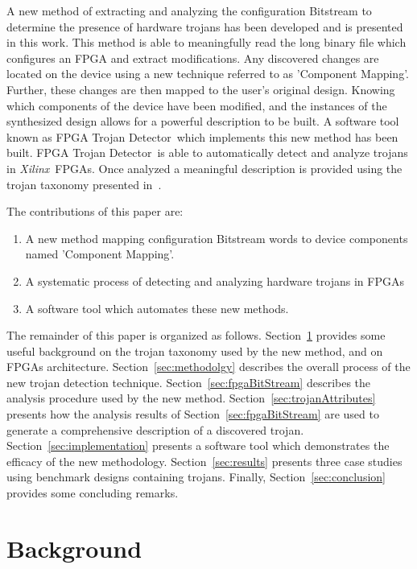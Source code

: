 \documentclass[conference]{IEEEtran}
\newcommand{\Xilinx}{\textit{\gls{Xilinx}}~}
\newcommand{\Name}{\acrshort{FPGA} Trojan Detector}
\newcommand{\NameNoPeriod}{\Name~}
\begin{document}
A new method of extracting and analyzing the configuration \gls{Bitstream} to determine the presence of hardware trojans has been developed and is presented in this work.
This method is able to meaningfully read the long binary file which configures an \acrshort{FPGA} and extract modifications.
Any discovered changes are located on the device using a new technique referred to as 'Component Mapping'.
Further, these changes are then mapped to the user's original design.
Knowing which components of the device have been modified, and the instances of the synthesized design allows for a powerful description to be built.
A software tool known as \NameNoPeriod which implements this new method has been built. 
\NameNoPeriod is able to automatically detect and analyze trojans in \Xilinx \acrshort{FPGAs}.
Once analyzed a meaningful description is provided using the trojan taxonomy presented in~\cite{samerAttribute}.

The contributions of this paper are:
\begin{enumerate}
	\item A new method mapping configuration \gls{Bitstream} words to device components named 'Component Mapping'.
	\item A systematic process of detecting and analyzing hardware trojans in \acrshort{FPGAs}
	\item A software tool which automates these new methods.
\end{enumerate}

The remainder of this paper is organized as follows.
Section~\ref{sec:background} provides some useful background on the trojan taxonomy used by the new method, and on \acrshort{FPGA}s architecture.
Section~\ref{sec:methodolgy} describes the overall process of the new trojan detection technique.
Section~\ref{sec:fpgaBitStream} describes the analysis procedure used by the new method.
Section~\ref{sec:trojanAttributes} presents how the analysis results of Section~\ref{sec:fpgaBitStream} are used to generate a comprehensive description of a discovered trojan.
Section~\ref{sec:implementation} presents a software tool which demonstrates the efficacy of the new methodology.
Section~\ref{sec:results} presents three case studies using benchmark designs containing trojans.
Finally, Section~\ref{sec:conclusion} provides some concluding remarks.

\section{Background} \label{sec:background}
\end{document}
